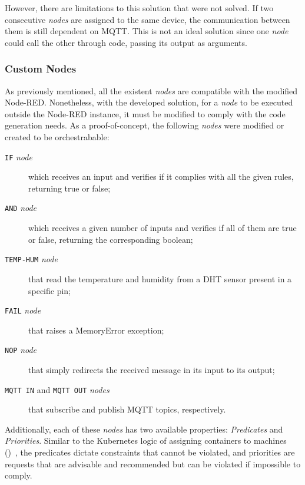 However, there are limitations to this solution that were not solved. If two consecutive \textit{nodes} are assigned to the same device, the communication between them is still dependent on MQTT. This is not an ideal solution since one \textit{node} could call the other through code, passing its output as arguments.

\subsubsection{Custom Nodes}\label{sec:custom_nodes}

As previously mentioned, all the existent \textit{nodes} are compatible with the modified Node-RED. Nonetheless, with the developed solution, for a \textit{node} to be executed outside the Node-RED instance, it must be modified to comply with the code generation needs. As a proof-of-concept, the following \textit{nodes} were modified or created to be orchestrabable:
\begin{description}
    \item[\texttt{IF} \textit{node}] which receives an input and verifies if it complies with all the given rules, returning true or false;
    \item[\texttt{AND} \textit{node}] which receives a given number of inputs and verifies if all of them are true or false, returning the corresponding boolean;
    \item[\texttt{TEMP-HUM} \textit{node}] that read the temperature and humidity from a DHT sensor present in a specific pin;
    \item[\texttt{FAIL} \textit{node}] that raises a MemoryError exception;
    \item[\texttt{NOP} \textit{node}] that simply redirects the received message in its input to its output;
    \item[\texttt{MQTT IN} and \texttt{MQTT OUT} \textit{nodes}] that subscribe and publish MQTT topics, respectively.
\end{description}

Additionally, each of these \textit{nodes} has two available properties: \textit{Predicates} and \textit{Priorities}. Similar to the Kubernetes logic of assigning containers to machines (\cf {})~\cite{burns2018managing}, the predicates dictate constraints that cannot be violated, and priorities are requests that are advisable and recommended but can be violated if impossible to comply. 

